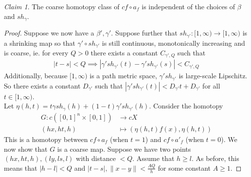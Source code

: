 \documentclass[a4paper,11pt]{article}
\theoremstyle{definition}
\theoremstyle{plain}
\theoremstyle{remark}
\newtheorem*{claim}{Claim}
\begin{document}
{\begin{claim} The coarse homotopy class of $cf \circ a_f$ is independent of the choices of $\beta$ and $sh_{\gamma}$. 
\end{claim}

\begin{proof} Suppose we now have a $\beta', \gamma'$. Suppose further that  $sh_{\gamma'}: [1,\infty)\rightarrow [1,\infty)$ is a shrinking map so that $\gamma' \circ sh_{\gamma'} $ is still continuous, monotonically increasing and is coarse, ie. for every $Q>0$ there exists a constant $C_{\gamma',Q}$ such that 
\begin{align*}
|t-s|<Q \implies |\gamma' sh_{\gamma'}(t)- \gamma' sh_{\gamma'}(s)|<C_{\gamma', Q}
\end{align*}
Additionally, because $[1,\infty)$ is a path metric space, $\gamma' sh_{\gamma'}$ is large-scale Lipschitz. So there exists a constant $D_{\gamma'}$ such that $|\gamma' sh_{\gamma'}(t)| < D_{\gamma'} t + D_{\gamma'}$ for all $t\in [1,\infty)$. \\

Let $\eta(h,t) = t \gamma sh_{\gamma}(h) + (1-t) \gamma'sh_{\gamma'}(h)$. Consider the homotopy
\begin{align*}
G: c([0,1]^n \times [0,1]) &\longrightarrow cX
\\ (hx,ht,h) &\longmapsto (\eta(h,t)f(x), \eta(h,t))
\end{align*}
This is a homotopy between $cf\circ a_{f}$ (when $t=1$) and $cf\circ a'_{f}$ (when $t=0$). We now show that $G$ is a coarse map. Suppose we have two points $(hx,ht,h), (ly,ls,l)$ with distance $<Q$. Assume that $h\geq l$. As before, this means that $|h-l|<Q$ and $|t-s|, \|x-y\|< \frac{AQ}{h}$ for some constant $A\geq 1$. 


\end{proof}}
\end{document}

